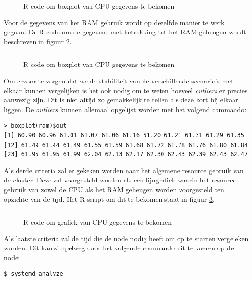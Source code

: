 \begin{figure}[h] 
	\inputminted[fontsize=\footnotesize,linenos]{R}{files/dataCpuBox.R}
	\caption{R code om boxplot van CPU gegevens te bekomen}
	\label{CPUBox}
\end{figure}
%

Voor de gegevens van het RAM gebruik wordt op dezelfde manier te werk gegaan. De R code om de gegevens met betrekking tot het RAM geheugen wordt beschreven in figuur \ref{RAMBox}.
\begin{figure}[h] 
	\inputminted[fontsize=\footnotesize,linenos]{R}{files/dataRAMBox.R}
	\caption{R code om boxplot van CPU gegevens te bekomen}
	\label{RAMBox}
\end{figure}

Om ervoor te zorgen dat we de stabiliteit van de verschillende scenario's  met elkaar kunnen vergelijken is het ook nodig om te weten hoeveel \textit{outliers} er precies aanwezig zijn. Dit is niet altijd zo gemakkelijk te tellen als deze kort bij elkaar liggen. De \textit{outliers} kunnen allemaal opgelijst worden met het volgend commando:
\begin{verbatim} 
> boxplot(ram)$out
[1] 60.90 60.96 61.01 61.07 61.06 61.16 61.20 61.21 61.31 61.29 61.35
[12] 61.49 61.44 61.49 61.55 61.59 61.68 61.72 61.78 61.76 61.80 61.84
[23] 61.95 61.95 61.99 62.04 62.13 62.17 62.30 62.43 62.39 62.43 62.47
\end{verbatim}

Als derde criteria zal er gekeken worden naar het algemene resource gebruik van de cluster. Deze zal voorgesteld worden als een lijngrafiek waarin het resource gebruik van zowel de CPU als het RAM geheugen worden voorgesteld ten opzichte van de tijd. Het R script om dit te bekomen staat in figuur \ref{CPUGraph}. 

\begin{figure}[h] 
	\inputminted[fontsize=\footnotesize,linenos]{R}{files/dataCpuGraph.R}
	\caption{R code om grafiek van CPU gegevens te bekomen}
	\label{CPUGraph}
\end{figure}

Als laatste criteria zal de tijd die de node nodig heeft om op te starten vergeleken worden. Dit kan simpelweg door het volgende commando uit te voeren op de node:
\begin{verbatim} 
$ systemd-analyze
\end{verbatim}

